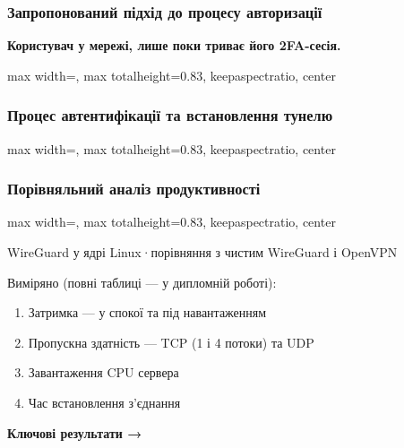 \documentclass[aspectratio=43,14pt]{beamer}
\newcommand{\fitfig}[1]{%
  \begin{adjustbox}{max width=\textwidth, max totalheight=0.83\textheight,
                    keepaspectratio, center}%
  \end{adjustbox}%
}
\begin{document}
\begin{frame}[c]
  \frametitle{Запропонований підхід до процесу авторизації}
  \begin{center}
    {\normalsize\bfseries\color{clAccent}
      Користувач у мережі, лише поки триває його 2FA-сесія.}
  \end{center}
  \vspace{0.2em}
  \fitfig{fig-idea}
\end{frame}


\begin{frame}[c]
  \frametitle{Процес автентифікації та встановлення тунелю}
  \fitfig{fig-sequence}
\end{frame}


\begin{frame}[shrink=15]
  \frametitle{Порівняльний аналіз продуктивності}
  \vspace*{0.10em}
  {\small
  \begin{center}
    \fitfig{fig-testbed}
    \par\vspace{0.20em}
    {\small\color{clGrey}
      WireGuard у ядрі Linux\;·\;порівняння з чистим WireGuard і OpenVPN}
  \end{center}
  \vspace{0.15em}
  Виміряно (повні таблиці --- у дипломній роботі):
  \begin{enumerate}
    \setlength{\itemsep}{0.15em}
    \item Затримка --- у спокої та під навантаженням
    \item Пропускна здатність --- TCP (1 і 4 потоки) та UDP
    \item Завантаження CPU сервера
    \item Час встановлення з'єднання
  \end{enumerate}
  \par\vspace{0.30em}
  {\color{clAccent}\bfseries Ключові результати →}
  }%
\end{frame}
\end{document}

